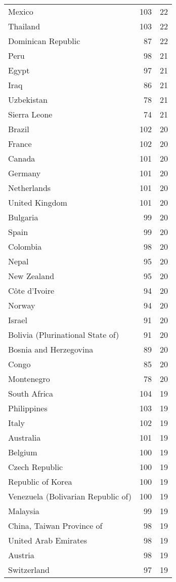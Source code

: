 \documentclass[]{article}
\begin{document}
\begin{longtable}[t]{lrr}
\addlinespace
Mexico & 103 & 22\\
Thailand & 103 & 22\\
Dominican Republic & 87 & 22\\
Peru & 98 & 21\\
Egypt & 97 & 21\\
\addlinespace
Iraq & 86 & 21\\
Uzbekistan & 78 & 21\\
Sierra Leone & 74 & 21\\
Brazil & 102 & 20\\
France & 102 & 20\\
\addlinespace
Canada & 101 & 20\\
Germany & 101 & 20\\
Netherlands & 101 & 20\\
United Kingdom & 101 & 20\\
Bulgaria & 99 & 20\\
\addlinespace
Spain & 99 & 20\\
Colombia & 98 & 20\\
Nepal & 95 & 20\\
New Zealand & 95 & 20\\
Côte d'Ivoire & 94 & 20\\
\addlinespace
Norway & 94 & 20\\
Israel & 91 & 20\\
Bolivia (Plurinational State of) & 91 & 20\\
Bosnia and Herzegovina & 89 & 20\\
Congo & 85 & 20\\
\addlinespace
Montenegro & 78 & 20\\
South Africa & 104 & 19\\
Philippines & 103 & 19\\
Italy & 102 & 19\\
Australia & 101 & 19\\
\addlinespace
Belgium & 100 & 19\\
Czech Republic & 100 & 19\\
Republic of Korea & 100 & 19\\
Venezuela (Bolivarian Republic of) & 100 & 19\\
Malaysia & 99 & 19\\
\addlinespace
China, Taiwan Province of & 98 & 19\\
United Arab Emirates & 98 & 19\\
Austria & 98 & 19\\
Switzerland & 97 & 19\\

\end{longtable}
\end{document}
